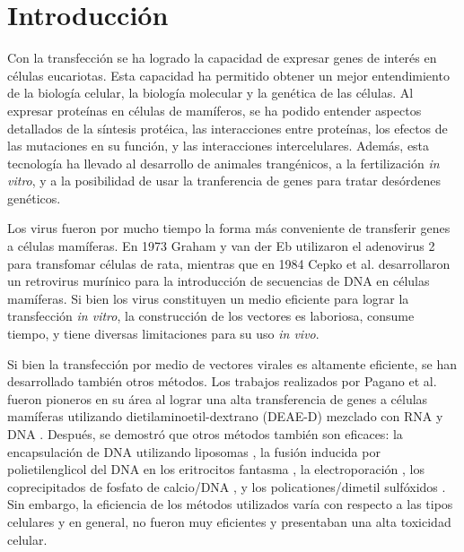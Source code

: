 \documentclass[fleqn,10pt]{SelfArx} %
\affiliation{\textsuperscript{1}\textit{Facultad de Ciencias Biológicas, Universidad Ricardo Palma, Lima, Peru}} %
\affiliation{*\textbf{Correspondencia}: jmanuel9112@icloud.com / giancuneo@gmail.com } %
\begin{document}
\flushbottom %

\maketitle %

\tableofcontents %

\thispagestyle{empty} %


\section{Introducción} 

Con la transfección se ha logrado la capacidad de expresar genes de interés en células eucariotas. Esta capacidad ha permitido obtener un mejor entendimiento de la biología celular, la biología molecular y la genética de las células. Al expresar proteínas en células de mamíferos, se ha podido entender aspectos detallados de la síntesis protéica, las interacciones entre proteínas, los efectos de las mutaciones en su función, y las interacciones intercelulares. Además, esta tecnología ha llevado al desarrollo de animales trangénicos, a la fertilización \textit{in vitro}, y a la posibilidad de usar la tranferencia de genes para tratar desórdenes genéticos.

Los virus fueron por mucho tiempo la forma más conveniente de transferir genes a células mamíferas. En 1973 Graham y van der Eb \cite{Graham:1973aa} utilizaron el adenovirus 2 para transfomar células de rata, mientras que en 1984 Cepko et al. \cite{Cepko:1984aa} desarrollaron un retrovirus murínico para la introducción de secuencias de DNA en células mamíferas. Si bien los virus constituyen un medio eficiente para lograr la transfección \textit{in vitro}, la construcción de los vectores es laboriosa, consume tiempo, y tiene diversas limitaciones para su uso \textit{in vivo}.

Si bien la transfección por medio de vectores virales es altamente eficiente, se han desarrollado también otros métodos. Los trabajos realizados por Pagano et al. fueron pioneros en su área al lograr una alta transferencia de genes a células mamíferas utilizando dietilaminoetil-dextrano (DEAE-D) mezclado con RNA y DNA  \cite{McCutchan:1968aa, Pagano:1967aa}. Después, se demostró que otros métodos también son eficaces: la encapsulación de DNA utilizando liposomas \cite{Fraley:1980aa, Wong:1980aa, Straubinger:1983aa, Fraley:1981aa}, la fusión inducida por polietilenglicol del DNA en los eritrocitos fantasma \cite{Straus:1980aa}, la electroporación \cite{Neumann:1982aa}, los coprecipitados de fosfato de calcio/DNA \cite{Wigler:1979aa}, y los policationes/dimetil sulfóxidos \cite{Kawai:1984aa}. Sin embargo, la eficiencia de los métodos utilizados varía con respecto a las tipos celulares y en general, no fueron muy eficientes y presentaban una alta toxicidad celular.
\end{document}
